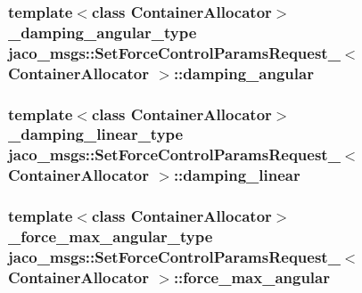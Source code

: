 \subsubsection[{\texorpdfstring{damping\+\_\+angular}{damping_angular}}]{\setlength{\rightskip}{0pt plus 5cm}template$<$class Container\+Allocator$>$ {\bf \+\_\+damping\+\_\+angular\+\_\+type} {\bf jaco\+\_\+msgs\+::\+Set\+Force\+Control\+Params\+Request\+\_\+}$<$ Container\+Allocator $>$\+::damping\+\_\+angular}\hypertarget{structjaco__msgs_1_1SetForceControlParamsRequest___aad2dc5a6c218abdb8723023e6ea7aa40}{}\label{structjaco__msgs_1_1SetForceControlParamsRequest___aad2dc5a6c218abdb8723023e6ea7aa40}
\subsubsection[{\texorpdfstring{damping\+\_\+linear}{damping_linear}}]{\setlength{\rightskip}{0pt plus 5cm}template$<$class Container\+Allocator$>$ {\bf \+\_\+damping\+\_\+linear\+\_\+type} {\bf jaco\+\_\+msgs\+::\+Set\+Force\+Control\+Params\+Request\+\_\+}$<$ Container\+Allocator $>$\+::damping\+\_\+linear}\hypertarget{structjaco__msgs_1_1SetForceControlParamsRequest___a8512d209d48fdb9db5ada5584e41033b}{}\label{structjaco__msgs_1_1SetForceControlParamsRequest___a8512d209d48fdb9db5ada5584e41033b}
\subsubsection[{\texorpdfstring{force\+\_\+max\+\_\+angular}{force_max_angular}}]{\setlength{\rightskip}{0pt plus 5cm}template$<$class Container\+Allocator$>$ {\bf \+\_\+force\+\_\+max\+\_\+angular\+\_\+type} {\bf jaco\+\_\+msgs\+::\+Set\+Force\+Control\+Params\+Request\+\_\+}$<$ Container\+Allocator $>$\+::force\+\_\+max\+\_\+angular}\hypertarget{structjaco__msgs_1_1SetForceControlParamsRequest___afa6dc239b7bd0cd6b43b4ccea1ec92af}{}\label{structjaco__msgs_1_1SetForceControlParamsRequest___afa6dc239b7bd0cd6b43b4ccea1ec92af}
